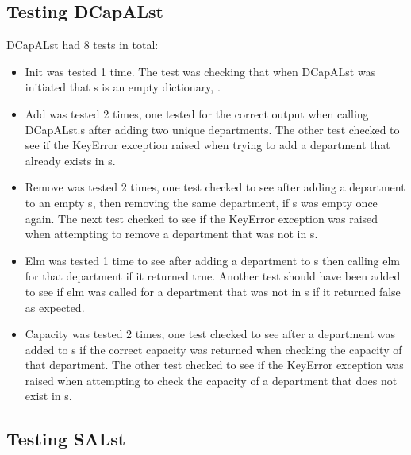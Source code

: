 \documentclass[12pt]{article}
\begin{document}
\subsection{Testing DCapALst}

DCapALst had 8 tests in total:
\begin{itemize}
	\item Init was tested 1 time. The test was checking that when DCapALst was initiated that s is an empty dictionary, {}. 
	
	\item Add was tested 2 times, one tested for the correct output when calling DCapALst.s after adding two unique departments. The other
	test checked to see if the KeyError exception raised when trying to add a department that already exists in s.
	
	\item Remove was tested 2 times, one test checked to see after adding a department to an empty s, then removing the same department, 
	if s was empty once again. The next test checked to see if the KeyError exception was raised when attempting to remove a department
	that was not in s.
	
	\item Elm was tested 1 time to see after adding a department to s then calling elm for that department if it returned true. Another 
	test should have been added to see if elm was called for a department that was not in s if it returned false as expected.
	
	\item Capacity was tested 2 times, one test checked to see after a department was added to s if the correct capacity was returned when
	checking the capacity of that department. The other test checked to see if the KeyError exception was raised when attempting to check
	the capacity of a department that does not exist in s.
	
\end{itemize}

\subsection{Testing SALst}
\end{document}
